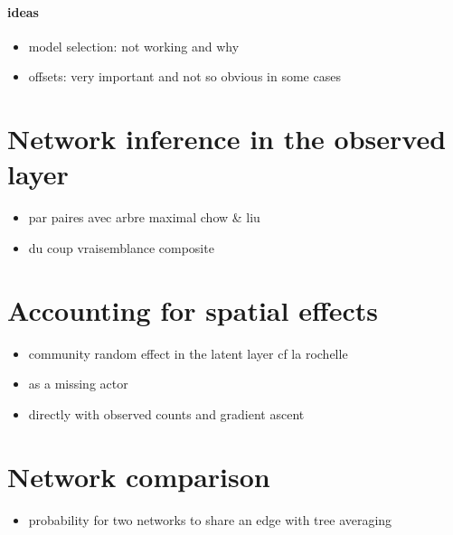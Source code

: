 \paragraph{ideas}
\begin{itemize}
\item model selection: not working and why
\item offsets: very important and not so obvious in some cases
\end{itemize} 


\section{Network inference in the observed layer}
\begin{itemize}
\item par paires avec arbre maximal chow \& liu
\item du coup vraisemblance composite
\end{itemize}

\section{Accounting for spatial effects}
\begin{itemize}
\item community random effect in the latent layer cf la rochelle
\item as a missing actor
\item directly with observed counts and gradient ascent
\end{itemize}

\section{Network comparison}
\begin{itemize}
\item probability for two networks to share an edge with tree averaging
\end{itemize}